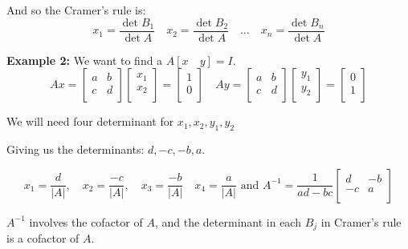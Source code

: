 And so the Cramer's rule is:
\[
  x_1 = \frac{\det B_1}{\det A}
  \quad 
  x_2 = \frac{\det B_2}{\det A}
  \quad 
  \ldots 
  \quad 
  x_n = \frac{\det B_n}{\det A}
\]



\textbf{Example 2:} We want to find a \(A[x \quad y] = I\). 
\[
  Ax = 
  \begin{bmatrix}
    a & b  \\
    c & d  \\
  \end{bmatrix}
  \begin{bmatrix}
     x_1 \\
     x_2 \\
  \end{bmatrix}
  = 
  \begin{bmatrix}
     1 \\
     0 \\
  \end{bmatrix}
  \quad 
  Ay = 
  \begin{bmatrix}
    a & b  \\
    c & d  \\
  \end{bmatrix}
  \begin{bmatrix}
     y_1 \\
     y_2 \\
  \end{bmatrix}
  = 
  \begin{bmatrix}
     0 \\
     1 \\
  \end{bmatrix}
\]



We will need four determinant for \(x_1, x_2, y_1, y_2\)



Giving us the determinants: \(d, -c, -b, a\). 


\[
  x_1 = \frac{d}{\vert A \vert },
  \quad 
  x_2 = \frac{-c}{\vert A \vert },
  \quad 
  x_3 = \frac{-b}{\vert A \vert }
  \quad 
  x_4 = \frac{a}{\vert A \vert }
  \text{ and }
  A^{-1} = \frac{1}{ad - bc}
  \begin{bmatrix}
    d & -b  \\
    -c & a  \\
  \end{bmatrix} 
\]

\(A^{-1} \) involves the cofactor of \(A\), and the determinant in each \(B_j\) in Cramer's rule is a cofactor of \(A\). 

